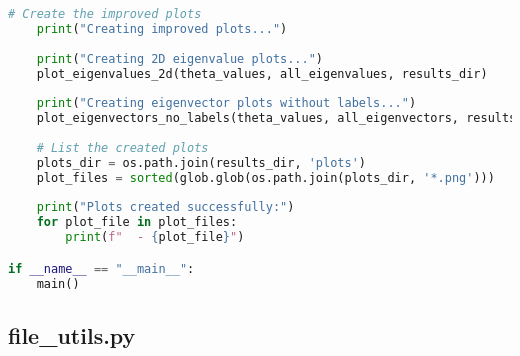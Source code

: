 \begin{lstlisting}[language=Python]
    # Create the improved plots
    print("Creating improved plots...")
    
    print("Creating 2D eigenvalue plots...")
    plot_eigenvalues_2d(theta_values, all_eigenvalues, results_dir)
    
    print("Creating eigenvector plots without labels...")
    plot_eigenvectors_no_labels(theta_values, all_eigenvectors, results_dir)
    
    # List the created plots
    plots_dir = os.path.join(results_dir, 'plots')
    plot_files = sorted(glob.glob(os.path.join(plots_dir, '*.png')))
    
    print("Plots created successfully:")
    for plot_file in plot_files:
        print(f"  - {plot_file}")

if __name__ == "__main__":
    main()
\end{lstlisting}

\subsection{file\_utils.py}

